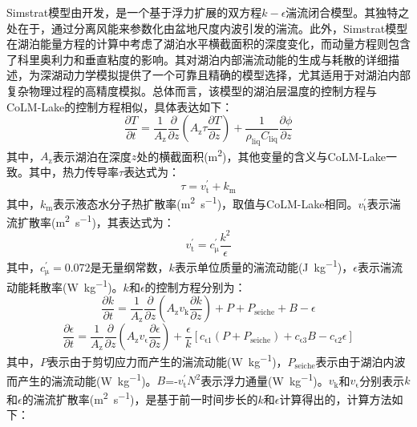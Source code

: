Simstrat模型由\citet{goudsmit2002application}开发，是一个基于浮力扩展的双方程$k-\epsilon$湍流闭合模型。其独特之处在于，通过分离风能来参数化由盆地尺度内波引发的湍流。此外，Simstrat模型在湖泊能量方程的计算中考虑了湖泊水平横截面积的深度变化，而动量方程则包含了科里奥利力和垂直粘度的影响。其对湖泊内部湍流动能的生成与耗散的详细描述，为深湖动力学模拟提供了一个可靠且精确的模型选择，尤其适用于对湖泊内部复杂物理过程的高精度模拟。总体而言，该模型的湖泊层温度的控制方程与CoLM-Lake的控制方程相似，具体表达如下：
\begin{equation}
    \frac{\partial T}{\partial t}=\frac{1}{A_{\mathrm{z}}} \frac{\partial}{\partial z}\left(A_{\mathrm{z}} \tau \frac{\partial T}{\partial z}\right)+\frac{1}{\rho_{\mathrm{liq}} C_{\mathrm{liq}}} \frac{\partial \phi}{\partial z}
\end{equation}
其中，$A_{\mathrm{z}}$表示湖泊在深度$z$处的横截面积(\unit{m^2})，其他变量的含义与CoLM-Lake一致。其中，热力传导率$\tau$表达式为：
\begin{equation}
    \tau = v^{\mathrm{'}}_{\mathrm{t}} + k_{\mathrm{m}}
\end{equation}
其中，$k_{\mathrm{m}}$表示液态水分子热扩散率(\unit{m^2.s^{-1}})，取值与CoLM-Lake相同。$v^{\mathrm{'}}_{\mathrm{t}}$表示湍流扩散率(\unit{m^2.s^{-1}})，其表达式为：
\begin{equation}
    v^{\mathrm{'}}_{\mathrm{t}} = c^{\mathrm{'}}_{\mathrm{\mu}}\frac{k^\mathrm{2}}{\epsilon}
\end{equation}
其中，$c^{\mathrm{'}}_{\mathrm{\mu}}=0.072$是无量纲常数，$k$表示单位质量的湍流动能(\unit{J.kg^{-1}})，$\epsilon$表示湍流动能耗散率(\unit{W.kg^{-1}})。$k$和$\epsilon$的控制方程分别为：
\begin{equation}
    \frac{\partial k}{\partial t} = \frac{1}{A_{\mathrm{z}}}\frac{\partial}{\partial z}\left(A_{\mathrm{z}} v_{\mathrm{k}} \frac{\partial k}{\partial z}\right) + P + P_{\mathrm{seiche}} + B - \epsilon
\end{equation}
\begin{equation}
    \frac{\partial \epsilon}{\partial t} = \frac{1}{A_{\mathrm{z}}}\frac{\partial}{\partial z}\left(A_{\mathrm{z}} v_{\mathrm{\epsilon}} \frac{\partial \epsilon}{\partial z}\right) + \frac{\epsilon}{k}\left[c_{\mathrm{\epsilon 1}} \left(P + P_{\mathrm{seiche}}\right) + c_{\mathrm{\epsilon 3}} B - c_{\mathrm{\epsilon 2}} \epsilon\right]
\end{equation}
其中，$P$表示由于剪切应力而产生的湍流动能(\unit{W.kg^{-1}})，$P_{\mathrm{seiche}}$表示由于湖泊内波而产生的湍流动能(\unit{W.kg^{-1}})。$B$=-$v^{\mathrm{'}}_{\mathrm{t}} N^2$表示浮力通量(\unit{W.kg^{-1}})。$v_{\mathrm{k}}$和$v_{\mathrm{\epsilon}}$分别表示$k$和$\epsilon$的湍流扩散率(\unit{m^2.s^{-1}})，是基于前一时间步长的$k$和$\epsilon$计算得出的，计算方法如下：
